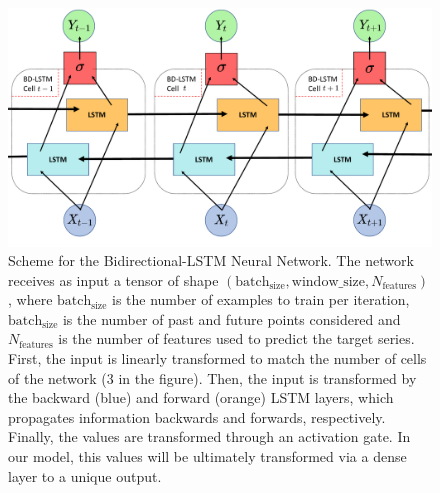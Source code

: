 \begin{figure}[H]
    \centering
    \includegraphics[width=\textwidth]{Figures/BD_LSTM_scheme.pdf}
    \caption{Scheme for the Bidirectional-LSTM Neural Network. The network
        receives as input a tensor of shape $(\textrm{batch}_\textrm{size},
            \textrm{window}\_\textrm{size}, N_{\textrm{features}})$, where
        $\textrm{batch}_\textrm{size}$ is the number of examples to train per
        iteration, $\textrm{batch}_\textrm{size}$ is the number of past and
        future
        points considered and $N_{\textrm{features}}$ is the number of features
        used to
        predict the target series. First, the input is linearly transformed to
        match
        the number of cells of the network (3 in the figure). Then, the input
        is
        transformed by the backward (blue) and forward (orange) LSTM layers,
        which
        propagates information backwards and forwards, respectively. Finally,
        the
        values are transformed through an activation gate. In our model, this
        values
        will be ultimately transformed via a dense layer to a unique output.}
    \label{fig:BD_LSTM_scheme}
\end{figure}